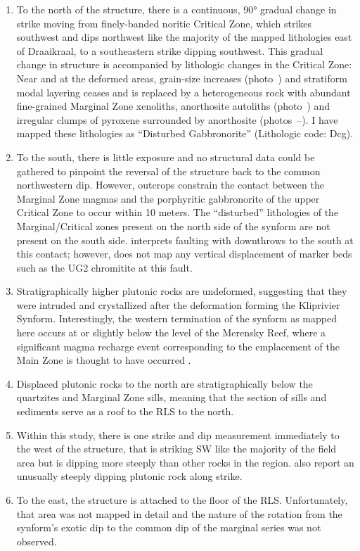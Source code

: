 \begin{enumerate}
\def\labelenumi{\arabic{enumi}.}
\item
  To the north of the structure, there is a continuous, 90° gradual
  change in strike moving from finely-banded noritic Critical Zone,
  which strikes southwest and dips northwest like the majority of the
  mapped lithologies east of Draaikraal, to a southeastern strike
  dipping southwest. This gradual change in structure is accompanied by
  lithologic changes in the Critical Zone: Near and at the deformed
  areas, grain-size increases (photo~) and stratiform modal layering
  ceases and is replaced by a heterogeneous rock with abundant
  fine-grained Marginal Zone xenoliths, anorthosite autoliths (photo~)
  and irregular clumps of pyroxene surrounded by anorthosite (photos~--). I have mapped these lithologies as ``Disturbed Gabbronorite''
  (Lithologic code: Dcg).
\item
  To the south, there is little exposure and no structural data could be
  gathered to pinpoint the reversal of the structure back to the common
  northwestern dip. However, outcrops constrain the contact between the
  Marginal Zone magmas and the porphyritic gabbronorite of the upper
  Critical Zone to occur within 10 meters. The ``disturbed'' lithologies
  of the Marginal/Critical zones present on the north side of the
  synform are not present on the south side. \citet{vandermerwe2007}
  interprets faulting with downthrows to the south at this contact;
  however, \citet{vandermerwe2007} does not map any vertical displacement of
  marker beds such as the UG2 chromitite at this fault.
\item
  Stratigraphically higher plutonic rocks are undeformed, suggesting
  that they were intruded and crystallized after the deformation forming
  the Kliprivier Synform. Interestingly, the western termination of the
  synform as mapped here occurs at or slightly below the level of the
  Merensky Reef, where a significant magma recharge event corresponding
  to the emplacement of the Main Zone is thought to have occurred
  \citep{seabrook2005,cameron1982}.
\item
  Displaced plutonic rocks to the north are stratigraphically below the
  quartzites and Marginal Zone sills, meaning that the section of sills
  and sediments serve as a roof to the RLS to the north.
\item
  Within this study, there is one strike and dip measurement immediately
  to the west of the structure, that is striking SW like the majority of
  the field area but is dipping more steeply than other rocks in the
  region. \citet{latypovetal2022} also report an unusually steeply dipping
  plutonic rock along strike.
\item
  To the east, the structure is attached to the floor of the RLS.
  Unfortunately, that area was not mapped in detail and the nature of
  the rotation from the synform's exotic dip to the common dip of the
  marginal series was not observed.
\end{enumerate}

